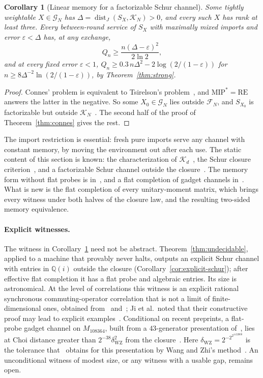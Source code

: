 \documentclass[11pt]{article}
\newtheorem{corollary}[lemma]{Corollary}
\theoremstyle{definition}
\theoremstyle{remark}
\DeclareMathOperator{\dist}{dist}
\newcommand{\K}{\mathcal K}
\newcommand{\G}{\mathcal G}
\newcommand{\Fm}{\mathcal F}
\newcommand{\eps}{\varepsilon}
\begin{document}
\begin{corollary}[Linear memory for a factorizable Schur channel]\label{cor:connes-negative}
Some tightly weightable $X\in\G_N$ has $\Delta=\dist_J(S_X,\K_N)>0$, and every such $X$ has rank at least three. Every between-round service of $S_X$ with maximally mixed imports and error $\eps<\Delta$ has, at any exchange,
\[
 Q_n\ge\frac{n(\Delta-\eps)^2}{2\ln2},
\]
and at every fixed error $\eps<1$, $Q_n\ge0.3\,n\Delta^2-2\log(2/(1-\eps))$ for $n\ge8\Delta^{-2}\ln(2/(1-\eps))$, by Theorem~\ref{thm:strong}.
\end{corollary}

\begin{proof}
Connes' problem is equivalent to Tsirelson's problem~\cite{Kirchberg,Fritz,JungeEtAl,Ozawa}, and $\mathrm{MIP}^*=\mathrm{RE}$~\cite{MIP} answers the latter in the negative. So some $X_0\in\G_N$ lies outside $\Fm_N$, and $S_{X_0}$ is factorizable but outside $\K_N$~\cite[Corollary~3.11]{Musat}. The second half of the proof of Theorem~\ref{thm:connes} gives the rest.
\end{proof}

The import restriction is essential: fresh pure imports serve any channel with constant memory, by moving the environment out after each use. The static content of this section is known: the characterization of $\K_d$~\cite{HM2015,MusatRordam21}, the Schur closure criterion~\cite{HM2011,HM2015,Musat,HarrisEtAl}, and a factorizable Schur channel outside the closure~\cite[Corollary~3.11]{Musat}. The memory form without flat probes is in~\cite[Corollary~F.3]{Memory}, and a flat completion of gadget channels in~\cite[Proposition~J.2]{Memory}. What is new is the flat completion of every unitary-moment matrix, which brings every witness under both halves of the closure law, and the resulting two-sided memory equivalence.

\paragraph{Explicit witnesses.}
The witness in Corollary~\ref{cor:connes-negative} need not be abstract. Theorem~\ref{thm:undecidable}, applied to a machine that provably never halts, outputs an explicit Schur channel with entries in $\mathbb Q(i)$ outside the closure (Corollary~\ref{cor:explicit-schur}); after effective flat completion it has a flat probe and algebraic entries. Its size is astronomical. At the level of correlations this witness is an explicit rational synchronous commuting-operator correlation that is not a limit of finite-dimensional ones, obtained from~\cite[Corollary~9.16]{MastelSlofstra} and~\cite[Section~4.2]{FanizzaEtAl}; Ji et al.\ noted that their constructive proof may lead to explicit examples~\cite{MIP}. Conditional on recent preprints, a flat-probe gadget channel on $M_{108364}$, built from a $43$-generator presentation of~\cite{RationalChannels}, lies at Choi distance greater than $2^{-38}\delta_{\mathrm{WZ}}^2$ from the closure~\cite[Proposition~5.5]{Law}. Here $\delta_{\mathrm{WZ}}=2^{-2^{2^{1122000}}}$ is the tolerance that~\cite[Theorem~D.4]{RationalChannels} obtains for this presentation by Wang and Zhi's method~\cite{WangZhi}. An unconditional witness of modest size, or any witness with a usable gap, remains open.
\end{document}
